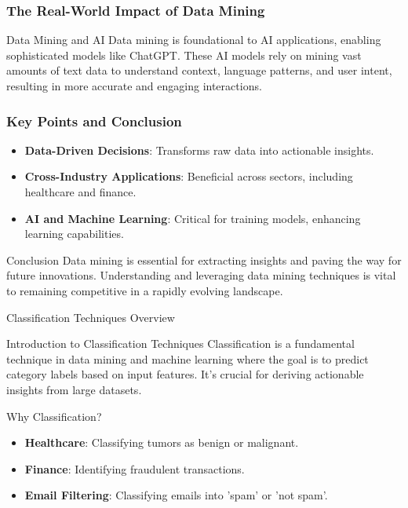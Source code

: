 \documentclass[aspectratio=169]{beamer}
\begin{document}
\begin{frame}[fragile]
    \frametitle{The Real-World Impact of Data Mining}
    \begin{block}{Data Mining and AI}
        Data mining is foundational to AI applications, enabling sophisticated models like ChatGPT. These AI models rely on mining vast amounts of text data to understand context, language patterns, and user intent, resulting in more accurate and engaging interactions.
    \end{block}
\end{frame}

\begin{frame}[fragile]
    \frametitle{Key Points and Conclusion}
    \begin{itemize}
        \item \textbf{Data-Driven Decisions}: Transforms raw data into actionable insights.
        \item \textbf{Cross-Industry Applications}: Beneficial across sectors, including healthcare and finance.
        \item \textbf{AI and Machine Learning}: Critical for training models, enhancing learning capabilities.
    \end{itemize}
    
    \begin{block}{Conclusion}
        Data mining is essential for extracting insights and paving the way for future innovations. Understanding and leveraging data mining techniques is vital to remaining competitive in a rapidly evolving landscape.
    \end{block}
\end{frame}

\begin{frame}[fragile]{Classification Techniques Overview}
    \begin{block}{Introduction to Classification Techniques}
        Classification is a fundamental technique in data mining and machine learning where the goal is to predict category labels based on input features. It's crucial for deriving actionable insights from large datasets.
    \end{block}
    
    \begin{block}{Why Classification?}
        \begin{itemize}
            \item \textbf{Healthcare}: Classifying tumors as benign or malignant.
            \item \textbf{Finance}: Identifying fraudulent transactions.
            \item \textbf{Email Filtering}: Classifying emails into 'spam' or 'not spam'.
        \end{itemize}
    \end{block}
\end{frame}
\end{document}

